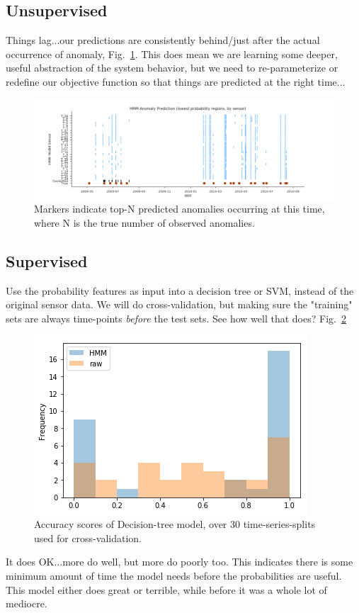 \documentclass[twocolumn,10pt]{article}
\begin{document}
\subsection{Unsupervised}
Things lag...our predictions are consistently behind/just after the actual occurrence of anomaly, Fig.~\ref{fig:unsupervised}. This does mean we are learning some deeper, useful abstraction of the system behavior, but we need to re-parameterize or redefine our objective function so that things are predicted at the right time...
\begin{figure}
    \centering
    \includegraphics[width=\linewidth]{unsupervised.png}
    \caption{Markers indicate top-N predicted anomalies occurring at this time, where N is the true number of observed anomalies. }
    \label{fig:unsupervised}
\end{figure}

\subsection{Supervised}
Use the probability features as input into a decision tree or SVM, instead of the original sensor data. We will do cross-validation, but making sure the "training" sets are always time-points \textit{before} the test sets. See how well that does? Fig.~\ref{fig:supervised} 

\begin{figure}
    \centering
    \includegraphics[width=\linewidth]{clf.png}
    \caption{Accuracy scores of Decision-tree model, over 30 time-series-splits used for cross-validation. }
    \label{fig:supervised}
\end{figure}
It does OK...more do well, but more do poorly too. This indicates there is some minimum amount of time the model needs before the probabilities are useful. This model either does great or terrible, while before it was a whole lot of mediocre. 
\end{document}
